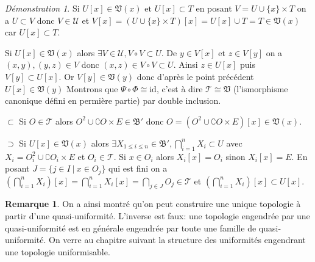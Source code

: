 \documentclass[a4paper, 11pt, french]{book}
\newenvironment{itemise}{\itemize}{\enditemize}
\theoremstyle{plain} %
\theoremstyle{definition} %
\newtheorem{remarque}{Remarque}
\theoremstyle{remark} %
\newtheorem*{demonstration}{Démonstration}
\newcommand{\1}{\mathds{1}}
\newcommand{\id}{\mathrm{id}}
\newcommand{\infegal}{\leqslant}
\newcommand\et{\text{ et }}
\newcommand\ens[2]{\{#1 \ |\ #2\}}
\begin{document}
\begin{demonstration}
\begin{itemise}
		\item Si $U[x]\in\mathfrak{V}(x)\et U[x]\subset T$ en posant $V=U\cup\{x\}\times T$ on a $U\subset V$ donc $V\in\mathscr{U}$ et $V[x]=(U\cup\{x\}\times T)[x]=U[x]\cup T=T\in\mathfrak{V}(x)$ car $U[x]\subset T$.
		\item Si $U[x]\in\mathfrak{V}(x)$ alors $\exists V\in\mathscr{U}, V\circ V\subset U$.
		De $y\in V[x]\et z\in V[y]$ on a $(x, y), (y, z)\in V$ donc $(x, z)\in V\circ V\subset U$.
		Ainsi $z\in U[x]$ puis $V[y]\subset U[x]$.
		Or $V[y]\in\mathfrak{V}(y)$ donc d'après le point précédent $U[x]\in\mathfrak{V}(y)$
	\end{itemise}
	Montrons que $\Psi\circ\Phi\cong\id$, c'est à dire $\mathscr{T}\cong\mathfrak{V}$ (l'ismorphisme canonique défini en permière partie) par double inclusion.
	\begin{itemise}
		\item[$\subset$] Si $O\in\mathscr{T}$ alors $O^2\cup\complement O\times E\in\mathfrak{B}'$ donc $O=(O^2\cup\complement O\times E)[x]\in\mathfrak{V}(x)$.
		\item[$\supset$] Si $U[x]\in\mathfrak{V}(x)$ alors $\exists X_{1\infegal i\infegal n}\in\mathfrak{B}', \bigcap_{i=1}^nX_i\subset U$ avec $X_i=O_i^2\cup\complement O_i\times E$ et $O_i\in\mathscr{T}$.
		Si $x\in O_i$ alors $X_i[x]=O_i$ sinon $X_i[x]=E$.
		En posant $J=\ens{j\in I}{x\in O_j}$ qui est fini on a $(\bigcap_{i=1}^nX_i)[x]=\bigcap_{i=1}^nX_i[x]=\bigcap_{j\in J}O_j\in\mathscr{T}$ et $(\bigcap_{i=1}^nX_i)[x]\subset U[x]$.
	\end{itemise}
\end{demonstration}

\begin{remarque}
	On a ainsi montré qu'on peut construire une unique topologie à partir d'une quasi-uniformité.
	L'inverse est faux: une topologie engendrée par une quasi-uniformité est en générale engendrée par toute une famille de quasi-uniformité.
	On verre au chapitre suivant la structure des uniformités engendrant une topologie uniformisable.
\end{remarque}
\end{document}
